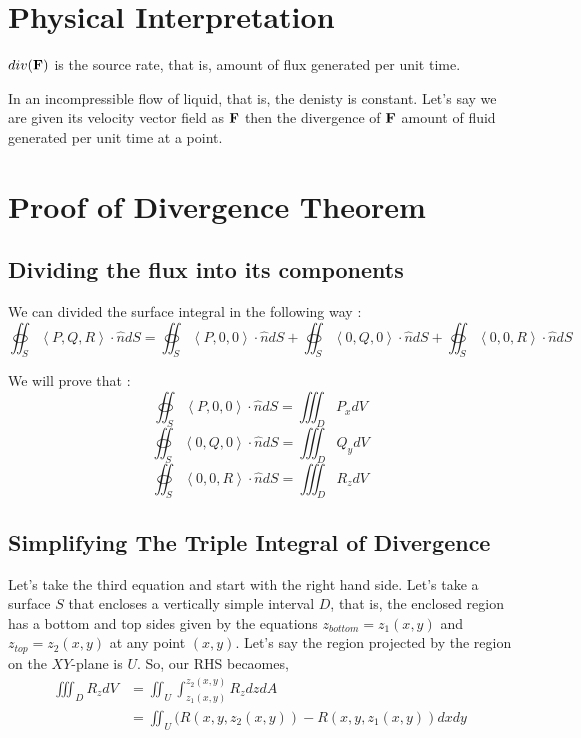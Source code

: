 \section{Physical Interpretation}

$div({\bf F})$ is the source rate, that is, amount of flux generated per unit time.

In an incompressible flow of liquid, that is, the denisty is constant. 
Let's say we are given its velocity vector field as ${\bf F}$ then the divergence of ${\bf F}$
amount of fluid generated per unit time at a point.

\section{Proof of Divergence Theorem}

\subsection{Dividing the flux into its components}

We can divided the surface integral in the following way :
$$
\oiint_S \left< P, Q, R \right> \cdot \hat{n} dS
    = \oiint_S \left< P, 0, 0 \right> \cdot \hat{n} dS
    + \oiint_S \left< 0, Q, 0 \right> \cdot \hat{n} dS
    + \oiint_S \left< 0, 0, R \right> \cdot \hat{n} dS
$$

We will prove that : 
$$ \oiint_S \left< P, 0, 0 \right> \cdot \hat{n} dS = \iiint_D P_x dV $$
$$ \oiint_S \left< 0, Q, 0 \right> \cdot \hat{n} dS = \iiint_D Q_y dV $$
$$ \oiint_S \left< 0, 0, R \right> \cdot \hat{n} dS = \iiint_D R_z dV $$

\subsection{Simplifying The Triple Integral of Divergence}

Let's take the third equation and start with the right hand side.
Let's take a surface $S$ that encloses a vertically simple interval $D$, that is,
the enclosed region has a bottom and top sides given by the equations $z_{bottom} = z_1(x, y)$ and $z_{top} = z_2(x, y)$ at any point $(x, y)$.
Let's say the region projected by the region on the $XY$-plane is $U$. 
So, our RHS becaomes,
\begin{align*}
    \iiint_D R_z dV & = \iint_U \int_{z_1(x, y)}^{z_2(x, y)} R_z dz dA \\
        & = \iint_U (R(x, y, z_2(x, y)) - R(x, y, z_1(x, y)) dx dy \\
\end{align*}

